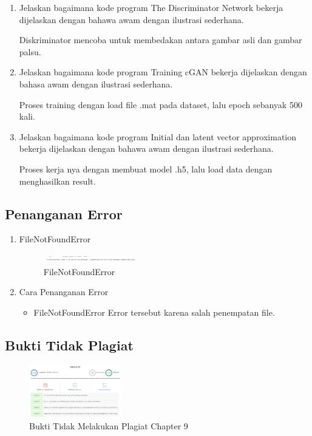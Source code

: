 \begin{enumerate}
	\item Jelaskan bagaimana kode program The Discriminator Network bekerja dijelaskan dengan bahawa awam dengan ilustrasi sederhana.
	\hfill\break
	
	Diskriminator mencoba untuk membedakan antara gambar asli dan gambar palsu.

	\item Jelaskan bagaimana kode program Training cGAN bekerja dijelaskan dengan bahasa awam dengan ilustrasi sederhana.
	\hfill\break
	
	Proses training dengan load file .mat pada dataset, lalu epoch sebanyak 500 kali.

	\item Jelaskan bagaimana kode program Initial dan latent vector approximation bekerja dijelaskan dengan bahawa awam dengan ilustrasi sederhana.
	\hfill\break
	
	Proses kerja nya dengan membuat model .h5, lalu load data dengan menghasilkan result.

\end{enumerate}

\subsection{Penanganan Error}
\begin{enumerate}
	\item FileNotFoundError
	\begin{figure}[H]
		\includegraphics[width=4cm]{figures/1174087/9/error.PNG}
		\centering
		\caption{FileNotFoundError}
	\end{figure}

	\item Cara Penanganan Error
	\begin{itemize}
		\item FileNotFoundError
		\hfill\break
		Error tersebut karena salah penempatan  file.
	\end{itemize}
\end{enumerate}

\subsection{Bukti Tidak Plagiat}
\begin{figure}[H]
\centering
	\includegraphics[width=4cm]{figures/1174087/9/bukticekplagiarismechapter9.PNG}
	\caption{Bukti Tidak Melakukan Plagiat Chapter 9}
\end{figure}